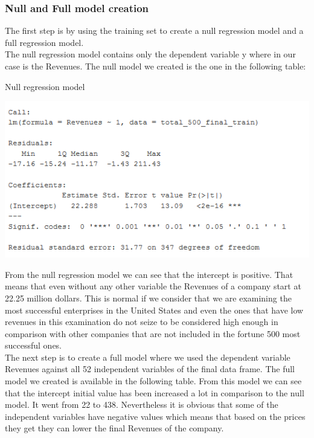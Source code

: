 \documentclass{book}
\begin{document}
\subsubsection{Null and Full model creation}
The first step is by using the training set to create a null regression model and a full regression model.\\
The null regression model contains only the dependent variable y where in our case is the Revenues. The null model we created is the one in the following table:
\begin{table}[H]
\centering
\caption{Null regression model}
\begin{center}
\includegraphics[scale=0.6]{../R/photos/65_null_model.PNG}   \\
\end{center}
\end{table}
From the null regression model we can see that the intercept is positive. That means that even without any other variable the Revenues of a company start at 22.25 million dollars. This is normal if we consider that we are examining the most successful enterprises in the United States and even the ones that have low revenues in this examination do not seize to be considered high enough in comparison with other companies that are not included in the fortune 500 most successful ones.\\
The next step is to create a full model where we used the dependent variable Revenues against all 52 independent variables of the final data frame. The full model we created is available in the following table. From this model we can see that the intercept initial value has been increased a lot in comparison to the null model. It went from 22 to 438. Nevertheless it is obvious that some of the independent variables have negative values which means that based on the prices they get they can lower the final Revenues of the company.\\
\end{document}

